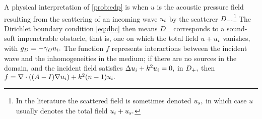 A physical interpretation of \cref{prob:edp} is when $u$ is the acoustic pressure field resulting from the scattering of an incoming wave $u_{i}$ by the scatterer $D_{-}.$\footnote{In the literature the scattered field is sometimes denoted $u_{s},$ in which case $u$ usually denotes the total field $u_{i}+ u_{s}.$} The Dirichlet boundary condition \eqref{eq:dbc} then means $D_{-}$ corresponds to a sound-soft impenetrable obstacle, that is, one on which the total field $u + u_{i}$ vanishes, with $g_{D} = - \gamma_{D} u_{i}.$ The function $f$ represents interactions between the incident wave and the inhomogeneities in the medium; if there are no sources in the domain, and the incident field satisfies $\Delta u_{i} + k^2 u_{i} = 0,$ in $D_{+},$ then $f = \grad \cdot \mleft(\mleft(A-I\mright) \grad \ui\mright) + k^2 \mleft(n-1\mright)\ui.$

